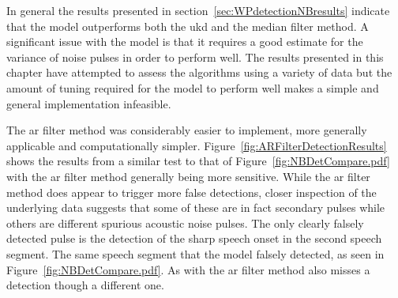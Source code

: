 In general the results presented in section~\ref{sec:WPdetectionNBresults} indicate that the \DIFdelbegin {}\DIFdelend \DIFaddbegin {}\DIFaddend model outperforms both the \DIFdelbegin {}\DIFdelend \DIFaddbegin \gls{ukd} \DIFaddend and the median filter method. A significant issue with the \DIFdelbegin {}\DIFdelend \DIFaddbegin {}\DIFaddend model is that it requires a good estimate for the variance of noise pulses in order to perform well. \DIFdelbegin {}\DIFdelend The results presented in this chapter have attempted to assess the algorithms using a variety of data but the amount of tuning required for the \DIFdelbegin {}\DIFdelend \DIFaddbegin {}\DIFaddend model to perform well makes a simple and general implementation infeasible.

The \DIFdelbegin {}\DIFdelend \DIFaddbegin \gls{ar} \DIFaddend filter method was considerably easier to implement, more generally applicable and computationally simpler. Figure~\ref{fig:ARFilterDetectionResults} shows the results from a similar test to that of Figure~\ref{fig:NBDetCompare.pdf} with the \DIFdelbegin {}\DIFdelend \DIFaddbegin \gls{ar} \DIFaddend filter method generally being more sensitive. While the \DIFdelbegin {}\DIFdelend \DIFaddbegin \gls{ar} \DIFaddend filter method does appear to trigger more false detections, closer inspection of the underlying data suggests that some of these are in fact secondary pulses while others are different spurious acoustic noise pulses. The only clearly falsely detected pulse is the detection of the sharp speech onset in the second speech segment. The same speech segment that the \DIFdelbegin {}\DIFdelend \DIFaddbegin {}\DIFaddend model falsely detected, as seen in Figure~\ref{fig:NBDetCompare.pdf}. As with the \DIFdelbegin {}\DIFdelend \DIFaddbegin {}\gls{ar} \DIFaddend filter method also misses a detection though a different one.

